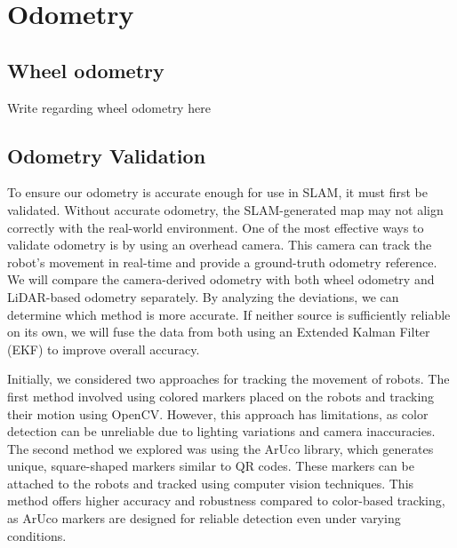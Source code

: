 \chapter{Odometry}

\section*{Wheel odometry}
{Write regarding wheel odometry here}

\section*{Odometry Validation}
To ensure our odometry is accurate enough for use in SLAM, it must first be validated. Without accurate odometry, the SLAM-generated map may not align correctly with the real-world environment. One of the most effective ways to validate odometry is by using an overhead camera. This camera can track the robot’s movement in real-time and provide a ground-truth odometry reference. We will compare the camera-derived odometry with both wheel odometry and LiDAR-based odometry separately. By analyzing the deviations, we can determine which method is more accurate. If neither source is sufficiently reliable on its own, we will fuse the data from both using an Extended Kalman Filter (EKF) to improve overall accuracy.
\newline

Initially, we considered two approaches for tracking the movement of robots. The first method involved using colored markers placed on the robots and tracking their motion using OpenCV. However, this approach has limitations, as color detection can be unreliable due to lighting variations and camera inaccuracies. The second method we explored was using the ArUco library, which generates unique, square-shaped markers similar to QR codes. These markers can be attached to the robots and tracked using computer vision techniques. This method offers higher accuracy and robustness compared to color-based tracking, as ArUco markers are designed for reliable detection even under varying conditions.